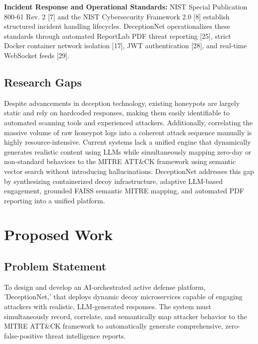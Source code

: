 \documentclass[12pt,a4paper]{report}
\begin{document}
\textbf{Incident Response and Operational Standards:} NIST Special Publication 800-61 Rev. 2 [7] and the NIST Cybersecurity Framework 2.0 [8] establish structured incident handling lifecycles. DeceptionNet operationalizes these standards through automated ReportLab PDF threat reporting [25], strict Docker container network isolation [17], JWT authentication [28], and real-time WebSocket feeds [29].

\section{Research Gaps}
Despite advancements in deception technology, existing honeypots are largely static and rely on hardcoded responses, making them easily identifiable to automated scanning tools and experienced attackers. Additionally, correlating the massive volume of raw honeypot logs into a coherent attack sequence manually is highly resource-intensive. Current systems lack a unified engine that dynamically generates realistic content using LLMs while simultaneously mapping zero-day or non-standard behaviors to the MITRE ATT\&CK framework using semantic vector search without introducing hallucinations. DeceptionNet addresses this gap by synthesizing containerized decoy infrastructure, adaptive LLM-based engagement, grounded FAISS semantic MITRE mapping, and automated PDF reporting into a unified platform.


\clearpage


\chapter{Proposed Work}

\section{Problem Statement}
To design and develop an AI-orchestrated active defense platform, 'DeceptionNet,' that deploys dynamic decoy microservices capable of engaging attackers with realistic, LLM-generated responses. The system must simultaneously record, correlate, and semantically map attacker behavior to the MITRE ATT\&CK framework to automatically generate comprehensive, zero-false-positive threat intelligence reports.
\end{document}
